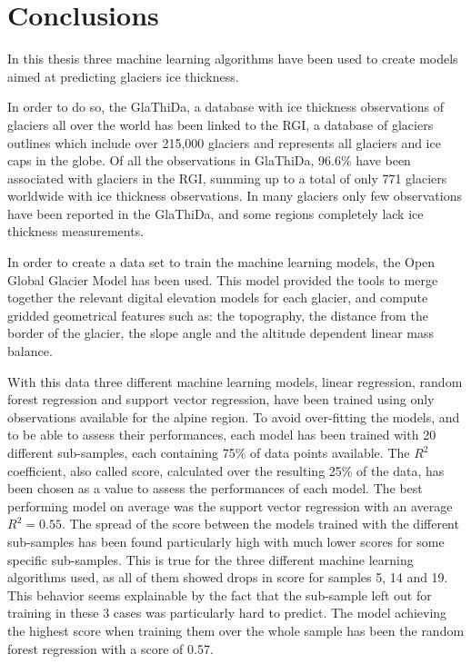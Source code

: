 \chapter{Conclusions}\label{concl}
\thispagestyle{plain}

In this thesis three machine learning algorithms have been used to create models aimed at predicting glaciers ice thickness.

In order to do so, the GlaThiDa, a database with ice thickness observations of glaciers all over the world has been linked to the RGI, a database of glaciers outlines which include over 215,000 glaciers and represents all glaciers and ice caps in the globe. Of all the observations in GlaThiDa, 96.6\% have been associated with glaciers in the RGI, summing up to a total of only 771 glaciers worldwide with ice thickness observations. In many glaciers only few observations have been reported in the GlaThiDa, and some regions completely lack ice thickness measurements.

In order to create a data set to train the machine learning models, the Open Global Glacier Model has been used. This model provided the tools to merge together the relevant digital elevation models for each glacier, and compute gridded geometrical features such as: the topography, the distance from the border of the glacier, the slope angle and the altitude dependent linear mass balance.

With this data three different machine learning models, linear regression, random forest regression and support vector regression, have been trained using only observations available for the alpine region. To avoid over-fitting the models, and to be able to assess their performances, each model has been trained with 20 different sub-samples, each containing 75\% of data points available. The $R^2$ coefficient, also called score, calculated over the resulting 25\% of the data, has been chosen as a value to assess the performances of each model. The best performing model on average was the support vector regression with an average $R^2 = 0.55$. The spread of the score between the models trained with the different sub-samples has been found particularly high with much lower scores for some specific sub-samples. This is true for the three different machine learning algorithms used, as all of them showed drops in score for samples 5, 14 and 19. This behavior seems explainable by the fact that the sub-sample left out for training in these 3 cases was particularly hard to predict.
The model achieving the highest score when training them over the whole sample has been the random forest regression with a score of 0.57.

